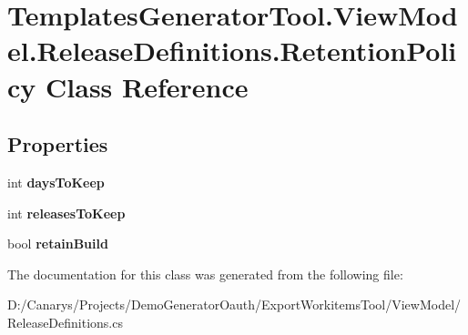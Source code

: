 \hypertarget{class_templates_generator_tool_1_1_view_model_1_1_release_definitions_1_1_retention_policy}{}\section{Templates\+Generator\+Tool.\+View\+Model.\+Release\+Definitions.\+Retention\+Policy Class Reference}
\label{class_templates_generator_tool_1_1_view_model_1_1_release_definitions_1_1_retention_policy}
\subsection*{Properties}
\begin{DoxyCompactItemize}
\item 
\mbox{\label{class_templates_generator_tool_1_1_view_model_1_1_release_definitions_1_1_retention_policy_a6244199885f6cae444ea9040ede92eb2}} 
int {\bfseries days\+To\+Keep}
\item 
\mbox{\label{class_templates_generator_tool_1_1_view_model_1_1_release_definitions_1_1_retention_policy_a833e7df1248dd241a8b996b4fa792d6b}} 
int {\bfseries releases\+To\+Keep}
\item 
\mbox{\label{class_templates_generator_tool_1_1_view_model_1_1_release_definitions_1_1_retention_policy_ab431facb8188b44ad8247e43cb5327ca}} 
bool {\bfseries retain\+Build}
\end{DoxyCompactItemize}


The documentation for this class was generated from the following file\+:\begin{DoxyCompactItemize}
\item 
D\+:/\+Canarys/\+Projects/\+Demo\+Generator\+Oauth/\+Export\+Workitems\+Tool/\+View\+Model/Release\+Definitions.\+cs\end{DoxyCompactItemize}
